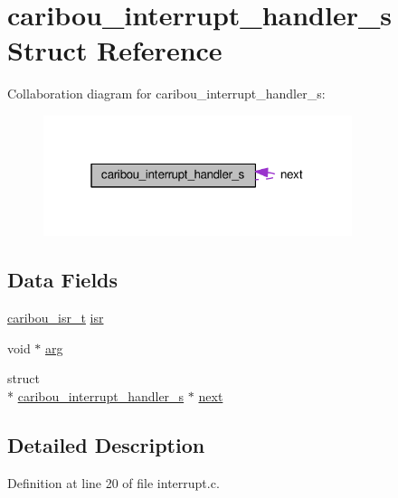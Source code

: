 \hypertarget{structcaribou__interrupt__handler__s}{\section{caribou\-\_\-interrupt\-\_\-handler\-\_\-s Struct Reference}
\label{structcaribou__interrupt__handler__s}
}


Collaboration diagram for caribou\-\_\-interrupt\-\_\-handler\-\_\-s\-:
\nopagebreak
\begin{figure}[H]
\begin{center}
\leavevmode
\includegraphics[width=256pt]{structcaribou__interrupt__handler__s__coll__graph}
\end{center}
\end{figure}
\subsection*{Data Fields}
\begin{DoxyCompactItemize}
\item 
\hyperlink{interrupt_8h_af609f1916308a4ac8148b51cad03f620}{caribou\-\_\-isr\-\_\-t} \hyperlink{structcaribou__interrupt__handler__s_aecb54a9629094e45d0de339021c6a1a0}{isr}
\item 
void $\ast$ \hyperlink{structcaribou__interrupt__handler__s_aefaec04418af509f17589f6e3ed6ff0e}{arg}
\item 
struct \\*
\hyperlink{structcaribou__interrupt__handler__s}{caribou\-\_\-interrupt\-\_\-handler\-\_\-s} $\ast$ \hyperlink{structcaribou__interrupt__handler__s_a0d58e1ee1f99080457360177c803b034}{next}
\end{DoxyCompactItemize}


\subsection{Detailed Description}


Definition at line 20 of file interrupt.\-c.



